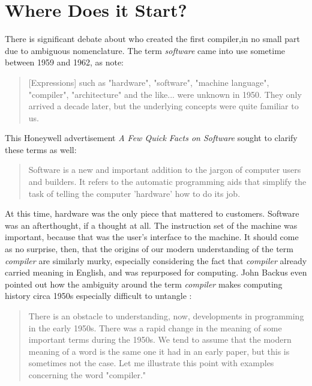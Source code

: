 \section{Where Does it Start?}

There is significant debate about who created the first compiler,in no small
part due to ambiguous nomenclature. The term \textit{software} came into use
sometime between 1959 and 1962, as \citeauthor{the-first-computers-2002} note:

\begin{quotation}
	[Expressions] such as "hardware", "software", "machine language",
	"compiler", "architecture" and the like... were unknown in 1950.
	They only arrived a decade later, but the underlying concepts were
	quite familiar to us.
	\cite{the-first-computers-2002}
\end{quotation}

This Honeywell advertisement \textit{A Few Quick Facts on Software} sought to
clarify these terms as well:

\begin{quotation}
	Software is a new and important addition to the jargon of computer
	users and builders. It refers to the automatic programming aids that
	simplify the task of telling the computer 'hardware' how to do its
	job.
	\cite[ch.5]{new-history-of-modern-computing}
\end{quotation}

At this time, hardware was the only piece that mattered to customers. Software
was an afterthought, if a thought at all. The instruction set of the machine was
important, because that was the user's interface to the machine. It should come
as no surprise, then, that the origins of our modern understanding of the term
\textit{compiler} are similarly murky, especially considering the fact that
\textit{compiler} already carried meaning in English, and was repurposed for
computing. John Backus even pointed out how the ambiguity around the term
\textit{compiler} makes computing history circa 1950s especially difficult to
untangle \cite{Backus_1980_Programming_in_America_in_1950s}:

\begin{quotation}
	There is an obstacle to understanding, now, developments in
	programming in the early 1950s. There was a rapid change in the
	meaning of some important terms during the 1950s. We tend to assume
	that the modern meaning of a word is the same one it had in an early
	paper, but this is sometimes not the case. Let me illustrate this
	point with examples concerning the word "compiler."
\end{quotation}

